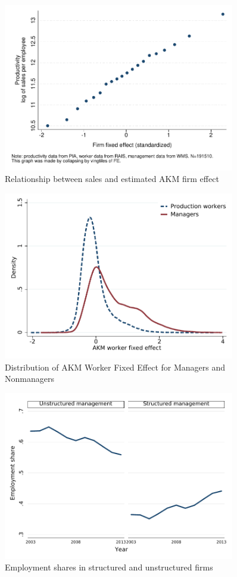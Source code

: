 \clearpage
\begin{figure}
    \includegraphics[width=0.9\textwidth]{./exhibits/cvb_fig7a_sa}
    \caption{Relationship between sales and estimated AKM firm effect}
    \label{fig:sales_v_fe}
\end{figure}


\clearpage

\clearpage


\clearpage
\begin{figure}
    \includegraphics[width = 0.9\textwidth]{./exhibits/pe_kdensity}
    \caption{Distribution of AKM Worker Fixed Effect for Managers and Nonmanagers}
    \label{fig:pe_kdensity}
\end{figure}

\begin{figure}
    \includegraphics[width = 0.9\textwidth]{./exhibits/fig_emp_shares_struc}
    \caption{Employment shares in structured and unstructured firms}
    \label{fig:emp_shares}
\end{figure}



